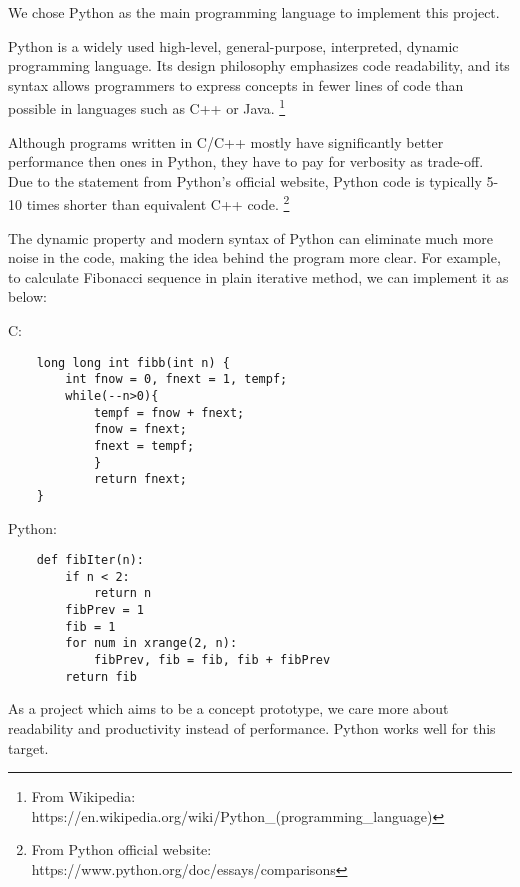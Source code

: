 \documentclass[../main.tex]{subfiles}
\begin{document}
We chose Python as the main programming language to implement this project.

Python is a widely used high-level, general-purpose, interpreted, dynamic programming language. 
Its design philosophy emphasizes code readability, 
and its syntax allows programmers to express concepts in fewer lines of code than possible in languages such as C++ or Java. 
\footnote{From Wikipedia: https://en.wikipedia.org/wiki/Python\_(programming\_language)}

Although programs written in C/C++ mostly have significantly better performance then ones in Python, they have to pay for verbosity as trade-off.
Due to the statement from Python's official website, Python code is typically 5-10 times shorter than equivalent C++ code.
\footnote{From Python official website: https://www.python.org/doc/essays/comparisons}

The dynamic property and modern syntax of Python can eliminate much more noise in the code, making the idea behind the program more clear. For example, to calculate Fibonacci sequence in plain iterative method, we can implement it as below:

C:
\begin{verbatim}
    long long int fibb(int n) {
        int fnow = 0, fnext = 1, tempf;
        while(--n>0){
            tempf = fnow + fnext;
            fnow = fnext;
            fnext = tempf;
            }
            return fnext;   
    }
\end{verbatim}

Python:
\begin{verbatim}
    def fibIter(n):
        if n < 2:
            return n
        fibPrev = 1
        fib = 1
        for num in xrange(2, n):
            fibPrev, fib = fib, fib + fibPrev
        return fib
\end{verbatim}

As a project which aims to be a concept prototype, we care more about readability and productivity instead of performance. Python works well for this target.
\end{document}
